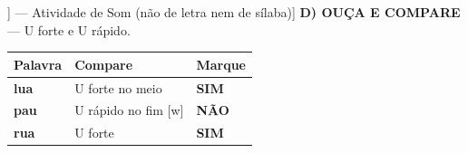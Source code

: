 \begin{exercicio}[Som /u/ [[u]] --- Atividade de Som (não de letra nem de sílaba)]
\textbf{D) OUÇA E COMPARE} --- U forte e U rápido.

\begin{center}
\begin{tabular}{@{}p{4.2cm}p{6.2cm}p{1.6cm}@{}}
\hline
\textbf{Palavra} & \textbf{Compare} & \textbf{Marque} \\
\hline
\textbf{lua} & U forte no meio & \textbf{SIM} \\
\textbf{pau} & U rápido no fim [w] & \textbf{NÃO} \\
\textbf{rua} & U forte & \textbf{SIM} \\
\hline
\end{tabular}
\end{center}

\end{exercicio}

